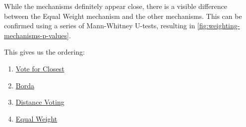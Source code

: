 
While the mechanisms definitely appear close, there is a visible difference between
the Equal Weight mechanism and the other mechanisms.
This can be confirmed using a series of Mann-Whitney U-tests, resulting in
\autoref{fig:weighting-mechanisms-p-values}.
\begin{samepage}
    This gives us the ordering:
    \begin{enumerate}
        \item \hyperref[para:closest]{Vote for Closest}
        \item \hyperref[para:borda]{Borda}
        \item \hyperref[para:distance-voting]{Distance Voting}
        \item \hyperref[para:equal-weight]{Equal Weight}
    \end{enumerate}
\end{samepage}

